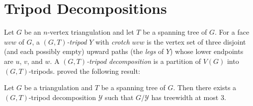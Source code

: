 \documentclass{patmorin}
\begin{document}






%

\section{Tripod Decompositions}
\label{tripod_decompositions}

Let $G$ be an $n$-vertex triangulation and let $T$ be a spanning tree of $G$. For a face $uvw$ of $G$, a \emph{$(G,T)$-tripod} $Y$ with \emph{crotch} $uvw$ is the vertex set of three disjoint (and each possibly empty) upward paths (the \emph{legs} of $Y$) whose lower endpoints are $u$, $v$, and $w$.  A \emph{$(G,T)$-tripod decomposition} is a partition of $V(G)$ into $(G,T)$-tripods.  \citet{dujmovic.joret.ea:planar} proved the following result:

\begin{thm}\label{tripod_decomposition}
  Let $G$ be a triangulation and $T$ be a spanning tree of $G$.  Then there exists a $(G,T)$-tripod decomposition $\mathcal{Y}$ such that $G/\mathcal{Y}$ has treewidth at most $3$.
\end{thm}
\end{document}
